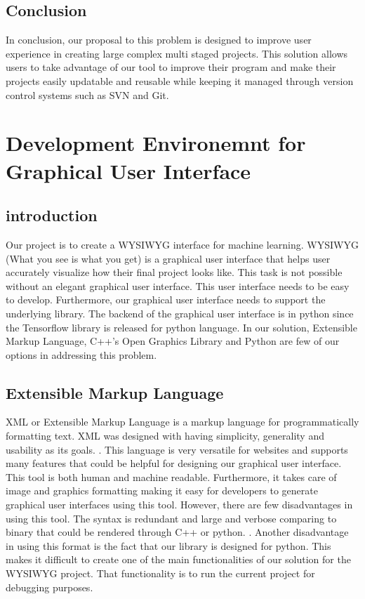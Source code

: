 \documentclass[journal,10pt,onecolumn,compsoc]{IEEEtran} \usepackage[margin=1.0in]{geometry} \usepackage{pdfpages} \usepackage{graphicx}
\begin{document}
\subsection{Conclusion}
In conclusion, our proposal to this problem is designed to improve user experience in creating large complex multi staged projects. 
This solution allows users to take advantage of our tool to improve their program and make their projects easily updatable and reusable while keeping it managed through version control systems such as SVN and Git.
\newpage

\section{Development Environemnt for Graphical User Interface}
\subsection{introduction}
Our project is to create a WYSIWYG interface for machine learning. 
WYSIWYG (What you see is what you get) is a graphical user interface that helps user accurately visualize how their final project looks like. 
This task is not possible without an elegant graphical user interface. 
This user interface needs to be easy to develop. 
Furthermore, our graphical user interface needs to support the underlying library. 
The backend of the graphical user interface is in python since the Tensorflow library is released for python language. 
In our solution, Extensible Markup Language, C++’s Open Graphics Library and Python are few of our options in addressing this problem.

\subsection{Extensible Markup Language}
XML or Extensible Markup Language is a markup language for programmatically formatting text. 
XML was designed with having simplicity, generality and usability as its goals. \cite{xmlf}. 
This language is very versatile for websites and supports many features that could be helpful for designing our graphical user interface. 
This tool is both human and machine readable. 
Furthermore, it takes care of image and graphics formatting making it easy for developers to generate graphical user interfaces using this tool. 
However, there are few disadvantages in using this tool. 
The syntax is redundant and large and verbose comparing to binary that could be rendered through C++ or python. \cite{xmls}. 
Another disadvantage in using this format  is the fact that our library is designed for python. 
This makes it difficult to create one of the main functionalities of our solution for the WYSIWYG project. 
That functionality is to run the current project for debugging purposes.
\end{document}
